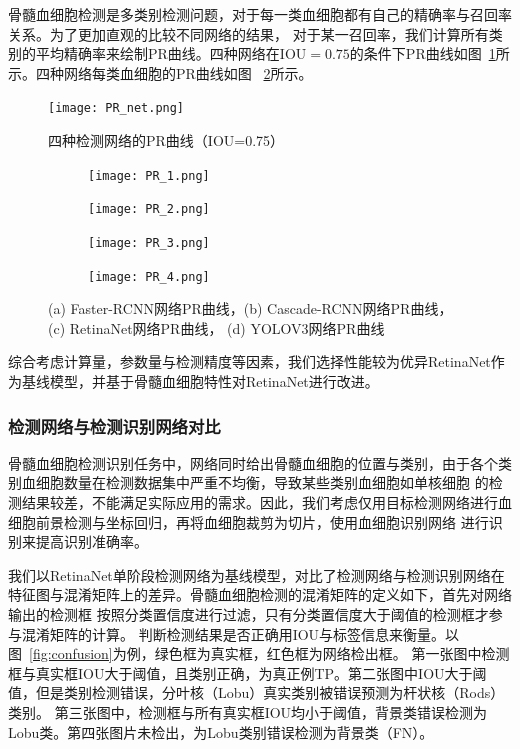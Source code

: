 骨髓血细胞检测是多类别检测问题，对于每一类血细胞都有自己的精确率与召回率关系。为了更加直观的比较不同网络的结果，
对于某一召回率，我们计算所有类别的平均精确率来绘制PR曲线。四种网络在$\text{IOU}=0.75$的条件下PR曲线如图~\ref{fig:pr_net}所示。四种网络每类血细胞的PR曲线如图
~\ref{fig:pr_curve}所示。
\begin{figure}                     
  \centering                      
  \texttt{[image: PR\_net.png]}                      
  \caption{四种检测网络的PR曲线（IOU=0.75）}                      
  \label{fig:pr_net}       
\end{figure}   

\begin{figure}[htbp]
	\centering
	\begin{subfigure}{0.4\linewidth}
		\centering
		\texttt{[image: PR\_1.png]}
    \caption{}
	\end{subfigure}
	\centering
	\begin{subfigure}{0.4\linewidth}
		\centering
		\texttt{[image: PR\_2.png]}
    \caption{}
	\end{subfigure}
  
	\centering
	\begin{subfigure}{0.4\linewidth}
		\centering
		\texttt{[image: PR\_3.png]}
    \caption{}
	\end{subfigure}
	\centering
	\begin{subfigure}{0.4\linewidth}
		\centering
		\texttt{[image: PR\_4.png]}
    \caption{}
	\end{subfigure}
	\caption{(a) Faster-RCNN网络PR曲线，(b)  Cascade-RCNN网络PR曲线， (c) RetinaNet网络PR曲线， (d) YOLOV3网络PR曲线}
	\label{fig:pr_curve}
\end{figure}

综合考虑计算量，参数量与检测精度等因素，我们选择性能较为优异RetinaNet作为基线模型，并基于骨髓血细胞特性对RetinaNet进行改进。

\subsubsection{检测网络与检测识别网络对比}

  骨髓血细胞检测识别任务中，网络同时给出骨髓血细胞的位置与类别，由于各个类别血细胞数量在检测数据集中严重不均衡，导致某些类别血细胞如单核细胞
的检测结果较差，不能满足实际应用的需求。因此，我们考虑仅用目标检测网络进行血细胞前景检测与坐标回归，再将血细胞裁剪为切片，使用血细胞识别网络
进行识别来提高识别准确率。
  
我们以RetinaNet单阶段检测网络为基线模型，对比了检测网络与检测识别网络在特征图与混淆矩阵上的差异。骨髓血细胞检测的混淆矩阵的定义如下，首先对网络输出的检测框
按照分类置信度进行过滤，只有分类置信度大于阈值的检测框才参与混淆矩阵的计算。
判断检测结果是否正确用IOU与标签信息来衡量。以图~\ref{fig:confusion}为例，绿色框为真实框，红色框为网络检出框。
第一张图中检测框与真实框IOU大于阈值，且类别正确，为真正例TP。第二张图中IOU大于阈值，但是类别检测错误，分叶核（Lobu）真实类别被错误预测为杆状核（Rods）类别。
第三张图中，检测框与所有真实框IOU均小于阈值，背景类错误检测为Lobu类。第四张图片未检出，为Lobu类别错误检测为背景类（FN）。

